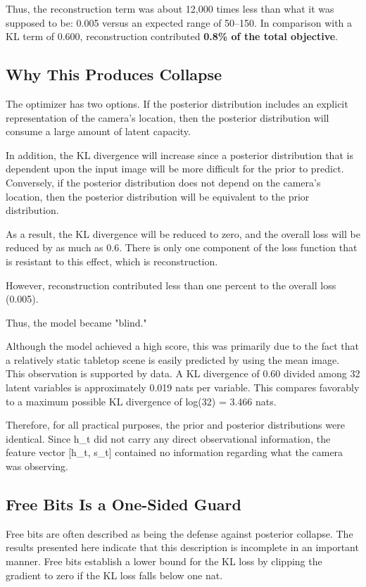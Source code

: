 \documentclass[12pt,a4paper,oneside]{report}
\begin{document}
Thus, the reconstruction term was about 12,000 times less than what it was supposed to be: 0.005 versus an expected range of 50--150. In comparison with a KL term of 0.600, reconstruction contributed \textbf{0.8\% of the total objective}.

\hypertarget{why-this-produces-collapse}{%
\subsection{Why This Produces Collapse}\label{why-this-produces-collapse}}
The optimizer has two options. If the posterior distribution includes an explicit representation of the camera's location, then the posterior distribution will consume a large amount of latent capacity.

In addition, the KL divergence will increase since a posterior distribution that is dependent upon the input image will be more difficult for the prior to predict. Conversely, if the posterior distribution does not depend on the camera's location, then the posterior distribution will be equivalent to the prior distribution.

As a result, the KL divergence will be reduced to zero, and the overall loss will be reduced by as much as 0.6. There is only one component of the loss function that is resistant to this effect, which is reconstruction.

However, reconstruction contributed less than one percent to the overall loss (0.005).

Thus, the model became "blind."

Although the model achieved a high score, this was primarily due to the fact that a relatively static tabletop scene is easily predicted by using the mean image. This observation is supported by data. A KL divergence of 0.60 divided among 32 latent variables is approximately 0.019 nats per variable. This compares favorably to a maximum possible KL divergence of log(32) = 3.466 nats.

Therefore, for all practical purposes, the prior and posterior distributions were identical. Since h\_t did not carry any direct observational information, the feature vector {[}h\_t, s\_t{]} contained no information regarding what the camera was observing.

\hypertarget{free-bits-is-a-one-sided-guard}{%
\subsection{Free Bits Is a One-Sided Guard}\label{free-bits-is-a-one-sided-guard}}
Free bits are often described as being the defense against posterior collapse. The results presented here indicate that this description is incomplete in an important manner. Free bits establish a lower bound for the KL loss by clipping the gradient to zero if the KL loss falls below one nat.
\end{document}
